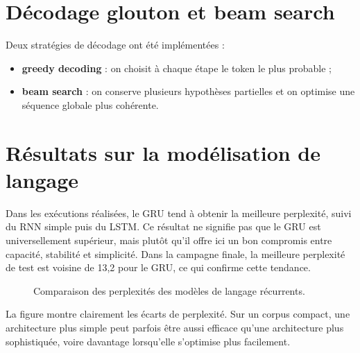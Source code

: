 \section{Décodage glouton et beam search}
Deux stratégies de décodage ont été implémentées :
\begin{itemize}[leftmargin=1.2cm]
    \item \textbf{greedy decoding} : on choisit à chaque étape le token le plus probable ;
    \item \textbf{beam search} : on conserve plusieurs hypothèses partielles et on optimise une séquence globale plus cohérente.
\end{itemize}

\section{Résultats sur la modélisation de langage}
\begin{table}[H]
    \centering
    \caption{Comparaison des modèles récurrents par perte et perplexité sur l’ensemble de test.}
\end{table}
Dans les exécutions réalisées, le GRU tend à obtenir la meilleure perplexité, suivi du RNN simple puis du LSTM. Ce résultat ne signifie pas que le GRU est universellement supérieur, mais plutôt qu’il offre ici un bon compromis entre capacité, stabilité et simplicité.
Dans la campagne finale, la meilleure perplexité de test est voisine de 13,2 pour le GRU, ce qui confirme cette tendance.

\begin{figure}[H]
    \centering
    \caption{Comparaison des perplexités des modèles de langage récurrents.}
\end{figure}
La figure montre clairement les écarts de perplexité. Sur un corpus compact, une architecture plus simple peut parfois être aussi efficace qu’une architecture plus sophistiquée, voire davantage lorsqu’elle s’optimise plus facilement.

